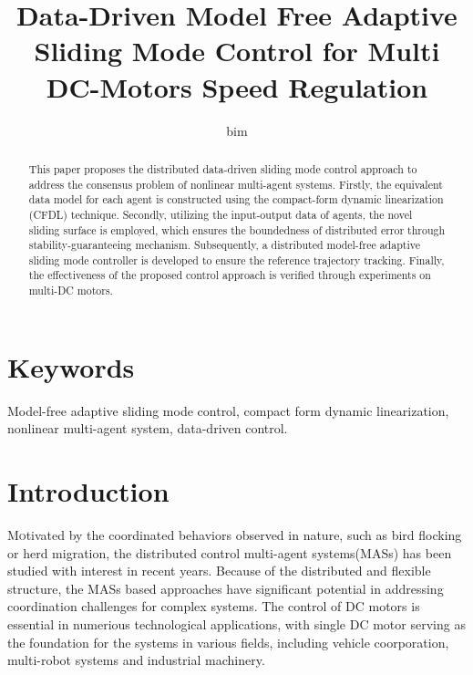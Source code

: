 \documentclass[journal,onecolumn]{IEEEtran}
\title{\LARGE Data-Driven Model Free Adaptive Sliding Mode Control for Multi DC-Motors Speed Regulation}
\author{bim}
\begin{document}
\maketitle


\begin{abstract}
    This paper proposes the distributed data-driven sliding mode control approach to address the consensus problem of nonlinear multi-agent systems. Firstly, the equivalent data model for each agent is constructed using the compact-form dynamic linearization (CFDL) technique. Secondly, utilizing the input-output data of agents, the novel sliding surface is employed, which ensures the boundedness of distributed error through stability-guaranteeing mechanism. Subsequently, a distributed model-free adaptive sliding mode controller is developed to ensure the reference trajectory tracking. Finally, the effectiveness of the proposed control approach is verified through experiments on multi-DC motors.
\end{abstract}


\section*{Keywords}
Model-free adaptive sliding mode control, compact form dynamic linearization, nonlinear multi-agent system, data-driven control.




\section{Introduction}\label{section:1}

\lettrine{M}otivated by the coordinated behaviors observed in nature, such as bird flocking or herd migration, the distributed control multi-agent systems(MASs) has been studied with interest in recent years.\cite{1} Because of the distributed and flexible structure, the MASs based approaches have significant potential in addressing coordination challenges for complex systems\cite{2}. The control of DC motors is essential in numerious technological applications, with single DC motor serving as the foundation for the systems in various fields, including vehicle coorporation\cite{3}, multi-robot systems and industrial machinery\cite{4}. 
\end{document}
